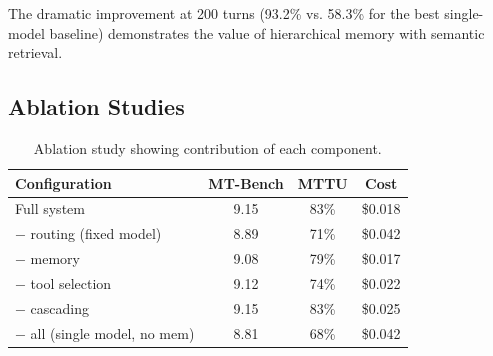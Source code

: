 The dramatic improvement at 200 turns (93.2\% vs. 58.3\% for the best single-model baseline) demonstrates the value of hierarchical memory with semantic retrieval.

\subsection{Ablation Studies}

\begin{table}[H]
\centering
\small
\begin{tabular}{lccc}
\toprule
\textbf{Configuration} & \textbf{MT-Bench} & \textbf{MTTU} & \textbf{Cost} \\
\midrule
Full system & 9.15 & 83\% & \$0.018 \\
$-$ routing (fixed model) & 8.89 & 71\% & \$0.042 \\
$-$ memory & 9.08 & 79\% & \$0.017 \\
$-$ tool selection & 9.12 & 74\% & \$0.022 \\
$-$ cascading & 9.15 & 83\% & \$0.025 \\
$-$ all (single model, no mem) & 8.81 & 68\% & \$0.042 \\
\bottomrule
\end{tabular}
\caption{Ablation study showing contribution of each component.}
\label{tab:ablation}
\end{table}

